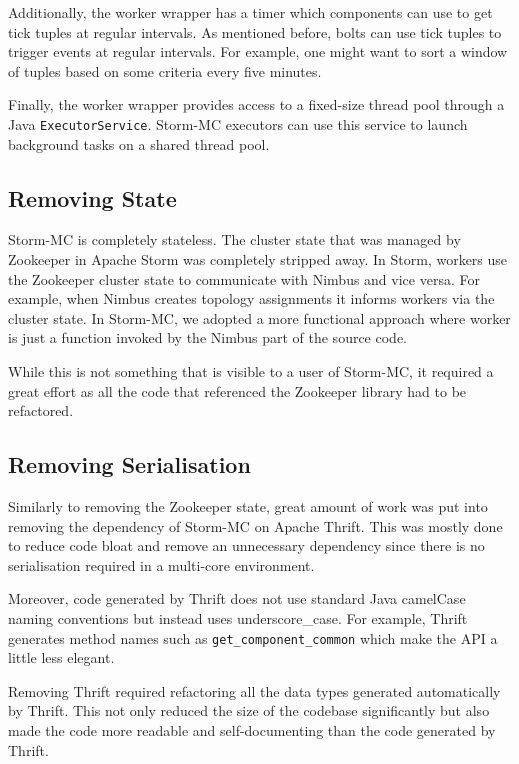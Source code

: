 Additionally, the worker wrapper has a timer which components can use to get tick tuples at regular intervals. As mentioned before, bolts can use tick tuples to trigger events at regular intervals. For example, one might want to sort a window of tuples based on some criteria every five minutes.


Finally, the worker wrapper provides access to a fixed-size thread pool through a Java \texttt{ExecutorService}. Storm-MC executors can use this service to launch background tasks on a shared thread pool.

\subsection{Removing State}

Storm-MC is completely stateless. The cluster state that was managed by Zookeeper in Apache Storm was completely stripped away. In Storm, workers use the Zookeeper cluster state to communicate with Nimbus and vice versa. For example, when Nimbus creates topology assignments it informs workers via the cluster state. In Storm-MC, we adopted a more functional approach where worker is just a function invoked by the Nimbus part of the source code.

While this is not something that is visible to a user of Storm-MC, it required a great effort as all the code that referenced the Zookeeper library had to be refactored.

\subsection{Removing Serialisation}

Similarly to removing the Zookeeper state, great amount of work was put into removing the dependency of Storm-MC on Apache Thrift. This was mostly done to reduce code bloat and remove an unnecessary dependency since there is no serialisation required in a multi-core environment.

Moreover, code generated by Thrift does not use standard Java camelCase naming conventions but instead uses underscore\_case. For example, Thrift generates method names such as \texttt{get\_component\_common} which make the API a little less elegant.

Removing Thrift required refactoring all the data types generated automatically by Thrift. This not only reduced the size of the codebase significantly but also made the code more readable and self-documenting than the code generated by Thrift.


